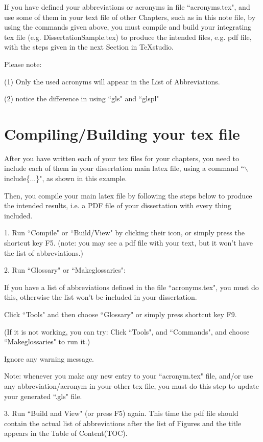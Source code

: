 If you have defined your abbreviations or acronyms in file ``acronyms.tex", and use some of them in your text file of other Chapters, such as in this note file, by using the commands given above, you must compile and build your integrating tex file (e.g. DissertationSample.tex) to produce the intended files, e.g. pdf file, with the steps given in the next Section in TeXstudio. 

Please note:

(1) Only the used acronyms will appear in the List of Abbreviations.

(2) notice the difference in using ``gls{}" and ``glspl{}"


\section{Compiling/Building your tex file}

After you have written each of your tex files for your chapters, you need to include each of them in your dissertation main latex file, using a command ``$\backslash$include\{...\}",  as shown in this example. 

Then, you compile your main latex file by following the steps below to produce the intended results, i.e. a PDF file of your dissertation with every thing included.   
  
1. Run ``Compile" or ``Build/View" by clicking their icon, or simply press the shortcut key F5.
(note: you may see a pdf file with your text, but it won't have the list of abbreviations.)

2. Run ``Glossary" or ``Makeglossaries": 

If you have a list of abbreviations defined in the file ``acronyms.tex", you must do this, otherwise the list won't be included in your dissertation.
  
Click ``Tools" and then choose ``Glossary" or simply press shortcut key F9. 

(If it is not working, you can try: Click ``Tools", and 
``Commands", and choose ``Makeglossaries" to run it.) 

Ignore any warning message.

Note: whenever you make any new entry to your ``acronym.tex" file, and/or use any abbreviation/acronym in your other tex file, you must do this step to update your generated ``.gls" file.   

3. Run ``Build and View" (or press F5) again. 
This time the pdf file should contain the actual list of abbreviations after the list of Figures and the title appears in the Table of Content(TOC).
          




